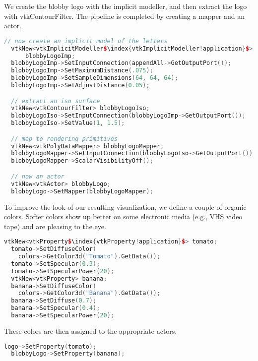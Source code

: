 \noindent We create the blobby logo with the implicit modeller, and then extract the logo with vtkContourFilter. The pipeline is completed by creating a mapper and an actor.

\begin{lstlisting}[language=C++, caption={Create an implicit model of the letters and extract the logo.}, escapechar=\$]
  // now create an implicit model of the letters
  vtkNew<vtkImplicitModeller$\index{vtkImplicitModeller!application}$>
      blobbyLogoImp;
  blobbyLogoImp->SetInputConnection(appendAll->GetOutputPort());
  blobbyLogoImp->SetMaximumDistance(.075);
  blobbyLogoImp->SetSampleDimensions(64, 64, 64);
  blobbyLogoImp->SetAdjustDistance(0.05);

  // extract an iso surface
  vtkNew<vtkContourFilter> blobbyLogoIso;
  blobbyLogoIso->SetInputConnection(blobbyLogoImp->GetOutputPort());
  blobbyLogoIso->SetValue(1, 1.5);

  // map to rendering primitives
  vtkNew<vtkPolyDataMapper> blobbyLogoMapper;
  blobbyLogoMapper->SetInputConnection(blobbyLogoIso->GetOutputPort());
  blobbyLogoMapper->ScalarVisibilityOff();

  // now an actor
  vtkNew<vtkActor> blobbyLogo;
  blobbyLogo->SetMapper(blobbyLogoMapper);
\end{lstlisting}

\noindent To improve the look of our resulting visualization, we define a couple of organic colors. Softer colors show up better on some electronic media (e.g., VHS video tape) and are pleasing to the eye.

\begin{lstlisting}[language=C++, caption={Define colors.}, escapechar=\$]
  vtkNew<vtkProperty$\index{vtkProperty!application}$> tomato;
  tomato->SetDiffuseColor(
    colors->GetColor3d("Tomato").GetData());
  tomato->SetSpecular(0.3);
  tomato->SetSpecularPower(20);
  vtkNew<vtkProperty> banana;
  banana->SetDiffuseColor(
    colors->GetColor3d("Banana").GetData());
  banana->SetDiffuse(0.7);
  banana->SetSpecular(0.4);
  banana->SetSpecularPower(20);
\end{lstlisting}

\noindent These colors are then assigned to the appropriate actors.

\begin{lstlisting}[language=C++, caption={Assign colors to the appropriate actors.}]
  logo->SetProperty(tomato);
  blobbyLogo->SetProperty(banana);
\end{lstlisting}

